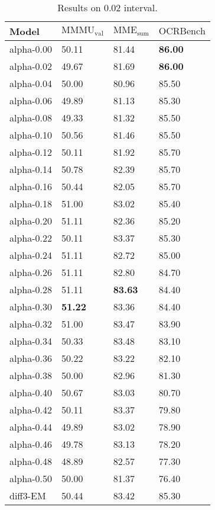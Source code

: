 
\begin{table}[!ht]
    \centering
    \begin{tabular}{llll}
     \toprule
        \textbf{Model} & $\mathrm{MMMU_{val}}$ &  $\mathrm{MME_{sum}}$ & $\mathrm{OCRBench}$   \\ 
        \midrule
       
        alpha-0.00 & 50.11  & 81.44  & \textbf{86.00}  \\ 
        alpha-0.02 & 49.67 & 81.69  & \textbf{86.00}  \\ 
        alpha-0.04 & 50.00  & 80.96  & 85.50  \\ 
        alpha-0.06 & 49.89  & 81.13  & 85.30  \\ 
        alpha-0.08 & 49.33  & 81.32  & 85.50  \\ 
        alpha-0.10 & 50.56  & 81.46  & 85.50  \\ 
        alpha-0.12 & 50.11  & 81.92  & 85.70  \\ 
        alpha-0.14 & 50.78  & 82.39  & 85.70  \\ 
        alpha-0.16 & 50.44  & 82.05  & 85.70  \\ 
        alpha-0.18 & 51.00  & 83.02  & 85.40  \\ 
        alpha-0.20 & 51.11  & 82.36  & 85.20  \\ 
        alpha-0.22 & 50.11  & 83.37  & 85.30  \\ 
        alpha-0.24 & 51.11  & 82.72  & 85.00  \\ 
        alpha-0.26 & 51.11  & 82.80  & 84.70  \\ 
        alpha-0.28 & 51.11  & \textbf{83.63}  & 84.40  \\ 
        alpha-0.30 & \textbf{51.22}  & 83.36  & 84.40  \\ 
        alpha-0.32 & 51.00  & 83.47  & 83.90  \\ 
        alpha-0.34 & 50.33  & 83.48  & 83.10  \\ 
        alpha-0.36 & 50.22  & 83.22  & 82.10  \\ 
        alpha-0.38 & 50.00  & 82.96  & 81.30  \\ 
        alpha-0.40 & 50.67  & 83.03  & 80.70  \\ 
        alpha-0.42 & 50.11  & 83.37  & 79.80  \\ 
        alpha-0.44 & 49.89  & 83.02  & 78.90  \\ 
        alpha-0.46 & 49.78  & 83.13  & 78.20  \\ 
        alpha-0.48 & 48.89  & 82.57  & 77.30  \\ 
        alpha-0.50 & 50.00  & 81.37  & 76.40 \\ 
          \midrule
        diff3-EM  & 50.44 & 83.42 &85.30 \\
         \bottomrule
    \end{tabular}%
    \caption{Results on 0.02 interval. }
    \label{tab:qwen0.02}
\end{table}